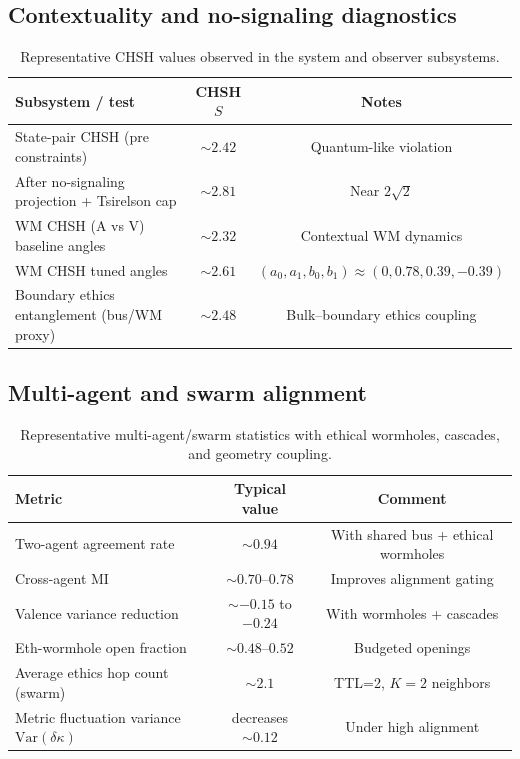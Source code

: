 \documentclass[11pt]{article}
\newcommand{\Var}{\mathrm{Var}}
\begin{document}
\subsection{Contextuality and no-signaling diagnostics}
\begin{table}[h]
\centering
\caption{Representative CHSH values observed in the system and observer subsystems.}
\begin{tabular}{@{}lcc@{}}
\toprule
Subsystem / test & CHSH $S$ & Notes \\ \midrule
State-pair CHSH (pre constraints) & $\sim 2.42$ & Quantum-like violation \\ 
After no-signaling projection + Tsirelson cap & $\sim 2.81$ & Near $2\sqrt{2}$ \\
WM CHSH (A vs V) baseline angles & $\sim 2.32$ & Contextual WM dynamics \\
WM CHSH tuned angles & $\sim 2.61$ & $(a_0,a_1,b_0,b_1)\approx(0,0.78,0.39,-0.39)$ \\
Boundary ethics entanglement (bus/WM proxy) & $\sim 2.48$ & Bulk--boundary ethics coupling \\
\bottomrule
\end{tabular}
\end{table}

\subsection{Multi-agent and swarm alignment}
\begin{table}[h]
\centering
\caption{Representative multi-agent/swarm statistics with ethical wormholes, cascades, and geometry coupling.}
\begin{tabular}{@{}lcc@{}}
\toprule
Metric & Typical value & Comment \\ \midrule
Two-agent agreement rate & $\sim 0.94$ & With shared bus + ethical wormholes \\
Cross-agent MI & $\sim 0.70$--$0.78$ & Improves alignment gating \\
Valence variance reduction & $\sim -0.15$ to $-0.24$ & With wormholes + cascades \\
Eth-wormhole open fraction & $\sim 0.48$--$0.52$ & Budgeted openings \\
Average ethics hop count (swarm) & $\sim 2.1$ & TTL=2, $K=2$ neighbors \\
Metric fluctuation variance $\Var(\delta\kappa)$ & decreases $\sim 0.12$ & Under high alignment \\
\bottomrule
\end{tabular}
\end{table}
\end{document}
